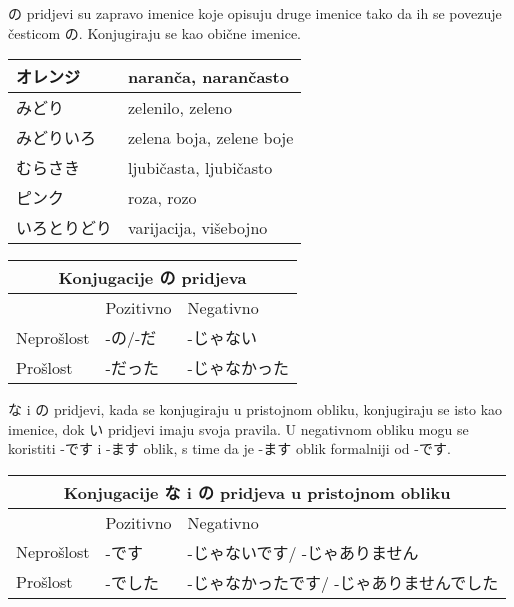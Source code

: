  の pridjevi su zapravo imenice koje opisuju druge imenice tako da ih se povezuje česticom の. Konjugiraju se kao obične imenice.
 
 	\vspace{10pt}
	\begin{tabular}{|l|l|}
		\hline
		オレンジ&naranča, narančasto\\\hline
		みどり&zelenilo, zeleno\\\hline
		みどりいろ&zelena boja, zelene boje\\\hline
		むらさき&ljubičasta, ljubičasto\\\hline
		ピンク&roza, rozo\\\hline
		いろとりどり&varijacija, višebojno\\\hline
	\end{tabular}
	
	\vspace{10pt}
	\begin{tabular}{|l||l|l|}
		\hline
		\multicolumn{3}{c}{Konjugacije の pridjeva}\\\hline
		 &Pozitivno&Negativno\\\hline
		Neprošlost&-の/-だ&-じゃない\\\hline
		Prošlost&-だった&-じゃなかった\\\hline
	\end{tabular}
	
	\begin{reibun}
	\end{reibun}
	


な i の pridjevi, kada se konjugiraju u pristojnom obliku, konjugiraju se isto kao imenice, dok い pridjevi imaju svoja pravila. U negativnom obliku mogu se koristiti -です i -ます oblik, s time da je -ます oblik formalniji od -です.

	\vspace{10pt}
	\begin{tabular}{|l||l|l|}
		\hline
		\multicolumn{3}{c}{Konjugacije な i の pridjeva u pristojnom obliku}\\\hline
		 &Pozitivno&Negativno\\\hline
		Neprošlost&-です&-じゃないです/ -じゃありません\\\hline
		Prošlost&-でした&-じゃなかったです/ -じゃありませんでした\\\hline
	\end{tabular}
	
